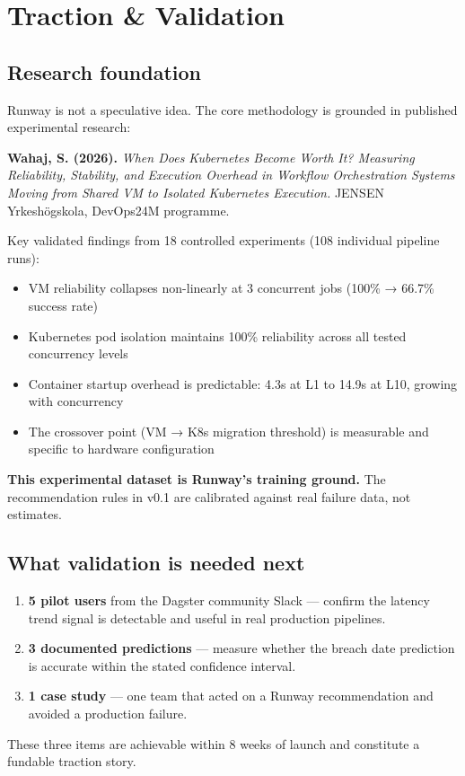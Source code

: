 
\section{Traction \& Validation}

\subsection{Research foundation}

Runway is not a speculative idea. The core methodology is grounded in published
experimental research:

\begin{callout}
\textbf{Wahaj, S. (2026).} \textit{When Does Kubernetes Become Worth It? Measuring
Reliability, Stability, and Execution Overhead in Workflow Orchestration Systems
Moving from Shared VM to Isolated Kubernetes Execution.}
JENSEN Yrkeshögskola, DevOps24M programme.
\end{callout}

Key validated findings from 18 controlled experiments (108 individual pipeline runs):

\begin{itemize}
  \item VM reliability collapses non-linearly at 3 concurrent jobs (100\% → 66.7\% success rate)
  \item Kubernetes pod isolation maintains 100\% reliability across all tested concurrency levels
  \item Container startup overhead is predictable: 4.3s at L1 to 14.9s at L10, growing with concurrency
  \item The crossover point (VM → K8s migration threshold) is measurable and specific to hardware configuration
\end{itemize}

\textbf{This experimental dataset is Runway's training ground.} The recommendation rules in
v0.1 are calibrated against real failure data, not estimates.

\subsection{What validation is needed next}

\begin{enumerate}
  \item \textbf{5 pilot users} from the Dagster community Slack — confirm the latency trend
        signal is detectable and useful in real production pipelines.
  \item \textbf{3 documented predictions} — measure whether the breach date prediction is
        accurate within the stated confidence interval.
  \item \textbf{1 case study} — one team that acted on a Runway recommendation and avoided
        a production failure.
\end{enumerate}

These three items are achievable within 8 weeks of launch and constitute a fundable traction story.
